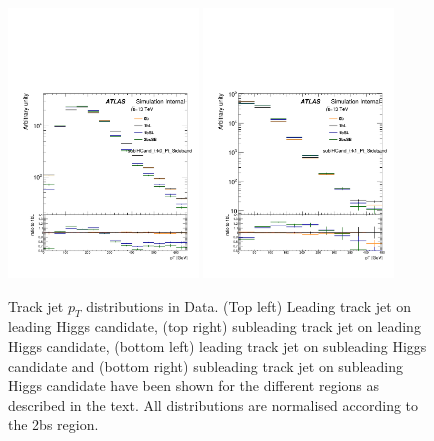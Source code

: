\begin{figure}[htbp!]
\begin{center}
\includegraphics[angle=270, width=0.45\textwidth]{./figures/boosted/AppendixDijetMC/sublHCand_trk0_Pt_SidebandwoPr_data.pdf}
\includegraphics[angle=270, width=0.45\textwidth]{./figures/boosted/AppendixDijetMC/sublHCand_trk1_Pt_SidebandwoPr_data.pdf}

 \caption{Track jet $p_{T}$ distributions in Data. (Top left) Leading track jet on leading Higgs candidate, (top right) subleading track jet on leading Higgs candidate, (bottom left) leading track jet on subleading Higgs candidate and (bottom right) subleading track jet on subleading Higgs candidate have been shown for the different regions as described in the text. All distributions are normalised according to the 2bs region.}

\label{fig:TjData}
\end{center}
\end{figure}

